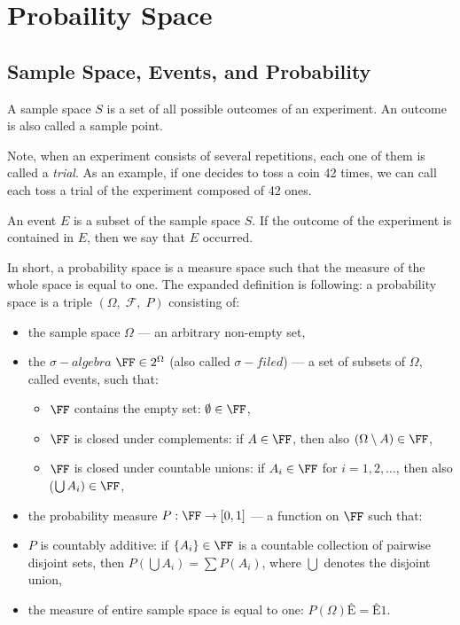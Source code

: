\chapter{Probaility Space}
\section{Sample Space, Events, and Probability}
\begin{deff}
	A sample space $S$ is a set of all possible outcomes of an experiment. An outcome is also called a sample point.
\end{deff}
Note, when an experiment consists of several repetitions, each one of them is called a {\em{trial}}. As an example, if one decides to toss a coin 42 times, we can call each toss a trial of the experiment composed of 42 ones.

\begin{deff}
	An event $E$ is a subset of the sample space $S$. If the outcome of the experiment is contained in $E$, then we say that $E$ occurred.
\end{deff}

\begin{deff}\label{def:probability}
In short, a probability space is a measure space such that the measure of the whole space is equal to one. The expanded definition is following: a probability space is a triple $(\Omega,\; \mathcal{F},\; P)$ consisting of:
\begin{itemize}
\item the sample space $\Omega$ --- an arbitrary non-empty set,
\item the $\sigma-algebra$ $\FF \in 2^\Omega$ (also called $\sigma-filed$) --- a set of subsets of $\Omega$, called events, such that:
	\begin{itemize}
	\item $\FF$ contains the empty set: $\emptyset \in \FF$,
	\item $\FF$ is closed under complements: if $A \in \FF$, then also $(\Omega \setminus A) \in \FF$,
	\item $\FF$ is closed under countable unions: if $A_i \in \FF$ for $i=1,2,\ldots$, then also ($\bigcup A_i) \in \FF$,
	\end{itemize}
\item the probability measure $P: \FF \rightarrow [0,1]$ --- a function on $\FF$ such that:
\item $P$ is countably additive: if $\{A_i\} \in \FF$ is a countable collection of pairwise disjoint sets, then $P(\bigcup A_i) = \sum P(A_i)$, where $\bigcup$ denotes the disjoint union,
\item the measure of entire sample space is equal to one: $P(\Omega)Ê=Ê1$.
\end{itemize}
\end{deff}

